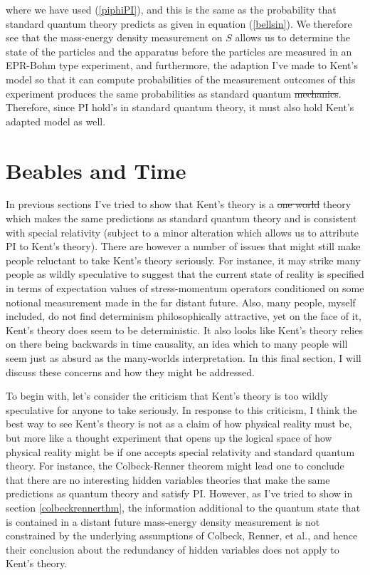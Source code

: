 \documentclass[12pt]{report}
\providecommand{\DIFadd}[1]{{\protect\color{blue}\uwave{#1}}} %
\providecommand{\DIFdel}[1]{{\protect\color{red}\sout{#1}}}                      %
\providecommand{\DIFaddbegin}{} %
\providecommand{\DIFaddend}{} %
\providecommand{\DIFdelbegin}{} %
\providecommand{\DIFdelend}{} %
\begin{document}
where we have used (\ref{piphiPI}), and this is the same as the probability that standard quantum theory predicts as given in equation (\ref{bellsin}). We therefore see that the mass-energy density measurement on $S$ allows us to determine the state of the particles and the apparatus before the particles are measured in an EPR-Bohm type experiment, and furthermore, the adaption I've made to Kent's model so that it can compute probabilities of the measurement outcomes of this experiment produces the same probabilities as standard quantum \DIFdelbegin \DIFdel{mechanics}\DIFdelend \DIFaddbegin \DIFadd{theory}\DIFaddend . Therefore, since PI hold's in standard quantum theory, it must also hold Kent's adapted model as well.\label{kentpiend}



\section{Beables and Time\label{beablesandtime}}
In previous sections I've tried to show that Kent's theory is a \DIFdelbegin \DIFdel{one world }\DIFdelend \DIFaddbegin \DIFadd{one-world }\DIFaddend theory which makes the same predictions as standard quantum theory and is consistent with special relativity (subject to a minor alteration which allows us to attribute PI to Kent's theory). There are however a number of issues that might still make people reluctant to take Kent's theory seriously. For instance, it may strike many people as wildly speculative to suggest that the current state of reality is specified in terms of expectation values of stress-momentum operators conditioned on some notional measurement made in the far distant future. Also, many people, myself included, do not find determinism philosophically attractive, yet on the face of it, Kent's theory does seem to be deterministic. It also looks like Kent's theory relies on there being backwards in time causality, an idea which to many people will seem just as absurd as the many-worlds interpretation. In this final section, I will discuss these concerns and how they might be addressed. 

To begin with, let's consider the criticism that Kent's theory is too wildly speculative for anyone to take seriously. In response to this criticism, I think the best way to see Kent's theory is not as a claim of how physical reality must be, but more like a thought experiment that opens up the logical space of how physical reality might be if one accepts special relativity and standard quantum theory. For instance, the Colbeck-Renner theorem might lead one to conclude that there are no interesting hidden variables theories that make the same predictions as quantum theory and satisfy PI. However, as I've tried to show in section \ref{colbeckrennerthm}, the information additional to the quantum state that is contained in a distant future mass-energy density measurement is not constrained by the underlying assumptions of Colbeck, Renner, et al., and hence their conclusion about the redundancy of hidden variables does not apply to Kent's theory. 
\end{document}
